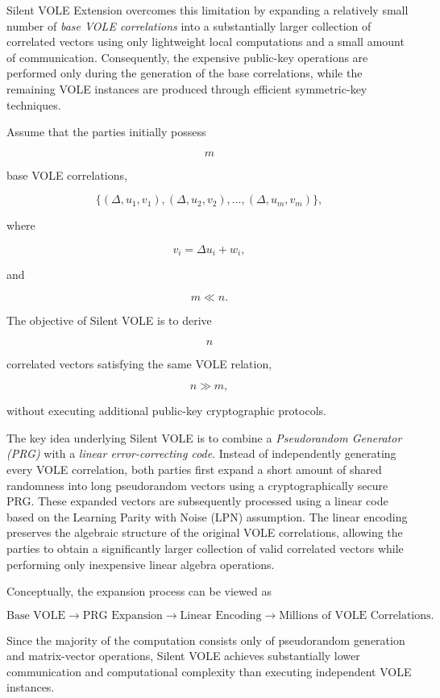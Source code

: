 \documentclass[11pt,a4paper]{article}
\begin{document}
Silent VOLE Extension overcomes this limitation by expanding a relatively
small number of \emph{base VOLE correlations} into a substantially larger
collection of correlated vectors using only lightweight local
computations and a small amount of communication. Consequently, the
expensive public-key operations are performed only during the generation
of the base correlations, while the remaining VOLE instances are produced
through efficient symmetric-key techniques.

Assume that the parties initially possess

\[
m
\]

base VOLE correlations,

\[
\{(\Delta,u_1,v_1),(\Delta,u_2,v_2),\ldots,(\Delta,u_m,v_m)\},
\]

where

\[
v_i=\Delta u_i+w_i,
\]

and

\[
m \ll n.
\]

The objective of Silent VOLE is to derive

\[
n
\]

correlated vectors satisfying the same VOLE relation,

\[
n \gg m,
\]

without executing additional public-key cryptographic protocols.

The key idea underlying Silent VOLE is to combine a
\emph{Pseudorandom Generator (PRG)} with a
\emph{linear error-correcting code}. Instead of independently generating
every VOLE correlation, both parties first expand a short amount of
shared randomness into long pseudorandom vectors using a cryptographically
secure PRG. These expanded vectors are subsequently processed using a
linear code based on the Learning Parity with Noise (LPN) assumption. The
linear encoding preserves the algebraic structure of the original VOLE
correlations, allowing the parties to obtain a significantly larger
collection of valid correlated vectors while performing only inexpensive
linear algebra operations.

Conceptually, the expansion process can be viewed as

\[
\text{Base VOLE}
\rightarrow
\text{PRG Expansion}
\rightarrow
\text{Linear Encoding}
\rightarrow
\text{Millions of VOLE Correlations}.
\]

Since the majority of the computation consists only of pseudorandom
generation and matrix-vector operations, Silent VOLE achieves
substantially lower communication and computational complexity than
executing independent VOLE instances.
\end{document}
